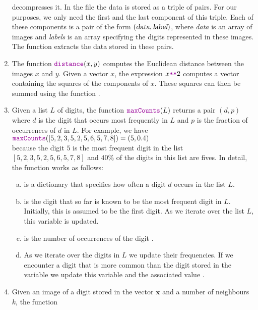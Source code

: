 \begin{enumerate}
      decompresses it.  In the file  the data is stored as a triple of pairs.
      For our purposes, we only need the first and the last component of this triple.  Each of these components
      is a pair of the form $(\textsl{data}, \textsl{label})$, where \textsl{data} is an array of images and
      \textsl{labels} is an array specifying the digits represented in these images.
      The function  extracts the data stored in these pairs.
\item The function $\mytt{distance}(x, y)$ computes the Euclidean distance between the images $x$ and $y$.
      Given a vector $x$, the expression $x \mytt{**} 2$ computes a vector containing the squares of the
      components of $x$.  These squares can then be summed using the  function .
\item Given a list $L$ of digits, the function $\mytt{maxCounts}(L)$ returns a pair $(d, p)$ where $d$ is the digit that occurs most frequently in $L$
      and $p$ is the fraction of occurrences of $d$ in $L$.  For example, we have
      \\[0.2cm]
      \hspace*{1.3cm}
      $\mytt{maxCounts}([5,2,3,5,2,5,6,5,7,8]) = (5, 0.4)$
      \\[0.2cm]
      because the digit $5$ is the most frequent digit in the list $[5,2,3,5,2,5,6,5,7,8]$ and $40$\%
      of the digits in this list are fives.  In detail, the function  works as follows:
      \begin{enumerate}[(a)]
      \item {} is a dictionary that specifies how often a digit $d$ occurs in the list $L$.
      \item {} is the digit that so far is known to be the most frequent digit in $L$.
            Initially, this is assumed to be the first digit.  As we iterate over the list $L$, this variable
            is updated.
      \item {} is the number of occurrences of the digit .
      \item As we iterate over the digits in $L$ we update their frequencies.  If we encounter a digit that is
            more common than the digit stored in the variable  we update this variable
            and the associated value .
      \end{enumerate}
\item Given an image of a digit stored in the vector $\mathbf{x}$ and a number of neighbours $k$, the function

\end{enumerate}
